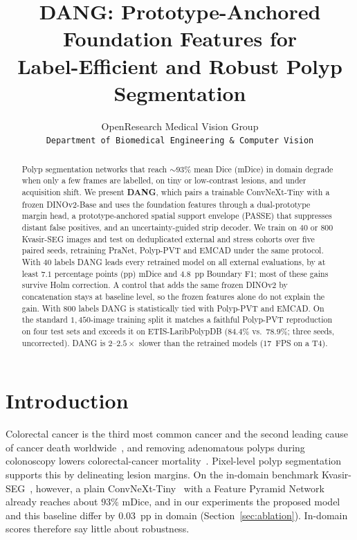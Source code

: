 \documentclass[10pt,twocolumn]{article}
\title{\textbf{DANG: Prototype-Anchored Foundation Features for\\Label-Efficient and Robust Polyp Segmentation}}
\author{
  OpenResearch Medical Vision Group \\
  \texttt{Department of Biomedical Engineering \& Computer Vision}
}
\date{}
\begin{document}
\maketitle

\begin{abstract}
Polyp segmentation networks that reach $\sim 93\%$ mean Dice (mDice) in domain degrade when only a few frames are labelled, on tiny or low-contrast lesions, and under acquisition shift. We present \textbf{DANG}, which pairs a trainable ConvNeXt-Tiny with a frozen DINOv2-Base and uses the foundation features through a dual-prototype margin head, a prototype-anchored spatial support envelope (PASSE) that suppresses distant false positives, and an uncertainty-guided strip decoder. We train on $40$ or $800$ Kvasir-SEG images and test on deduplicated external and stress cohorts over five paired seeds, retraining PraNet, Polyp-PVT and EMCAD under the same protocol. With $40$ labels DANG leads every retrained model on all external evaluations, by at least $7.1$ percentage points (pp) mDice and $4.8$~pp Boundary F1; most of these gains survive Holm correction. A control that adds the same frozen DINOv2 by concatenation stays at baseline level, so the frozen features alone do not explain the gain. With $800$ labels DANG is statistically tied with Polyp-PVT and EMCAD. On the standard $1{,}450$-image training split it matches a faithful Polyp-PVT reproduction on four test sets and exceeds it on ETIS-LaribPolypDB ($84.4\%$ vs.\ $78.9\%$; three seeds, uncorrected). DANG is $2$--$2.5\times$ slower than the retrained models ($17$~FPS on a T4).
\end{abstract}

\section{Introduction}
Colorectal cancer is the third most common cancer and the second leading cause of cancer death worldwide~\citep{sung2021globocan}, and removing adenomatous polyps during colonoscopy lowers colorectal-cancer mortality~\citep{zauber2012polypectomy}. Pixel-level polyp segmentation supports this by delineating lesion margins. On the in-domain benchmark Kvasir-SEG~\citep{jha2020kvasir}, however, a plain ConvNeXt-Tiny~\citep{liu2022convnet} with a Feature Pyramid Network~\citep{lin2017fpn} already reaches about $93\%$ mDice, and in our experiments the proposed model and this baseline differ by $0.03$~pp in domain (Section~\ref{sec:ablation}). In-domain scores therefore say little about robustness.
\end{document}

